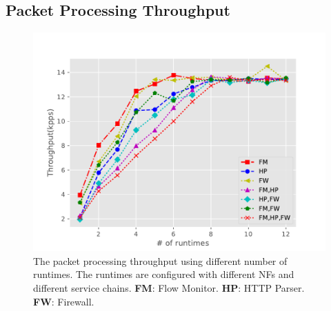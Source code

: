 

\subsection{Packet Processing Throughput}
\label{sec:ppc}

\begin{figure}[!t]
	\centering
	\includegraphics[width=\columnwidth]{figure/NormalCaseTP.pdf}
	\caption{The packet processing throughput using different number of runtimes. The runtimes are configured with different NFs and different service chains.
  \textbf{FM}: Flow Monitor. \textbf{HP}: HTTP Parser. \textbf{FW}: Firewall.}
\label{fig:normal-case-eval}
\end{figure}


